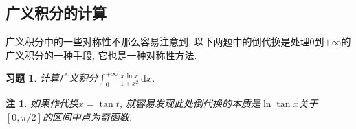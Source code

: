 \documentclass[11pt,a4paper]{ctexart}
\makeatletter
\theoremstyle{thmseries} %
\theoremstyle{exerseries}
\newtheorem{exer}{习题}[section]
\newtheorem*{rem}{注}
\renewenvironment{proof}[1][\proofname]{\par
  \pushQED{\qed}%
  \normalfont \topsep6\p@\@plus6\p@\relax
  \trivlist
  \item[\hskip\labelsep
        \itshape
    #1\@addpunct{}]\ignorespaces
}{%
  \popQED\endtrivlist\@endpefalse
}
\newenvironment{sol}{\begin{proof}[\bfseries\upshape 解\quad]}{\end{proof}}
\newcommand{\bra}[1]{\mathopen{}\left(#1\right)}
\newcommand{\sbra}[1]{\mathopen{}\left[#1\right]}
\newcommand{\R}{\mathbb{R}}
\renewcommand{\d}{\mathrm{d}}
\newcommand{\e}{\mathrm{e}}
\makeatother
\begin{document}





\subsection{广义积分的计算}
广义积分中的一些对称性不那么容易注意到. 以下两题中的倒代换是处理$0$到$+\infty$的广义积分的一种手段, 它也是一种对称性方法. 
\begin{exer}
	计算广义积分$\int_{0}^{+\infty}\frac{x\ln x}{1+x^2}\,\d x$. 
\end{exer}
\begin{rem}
	如果作代换$x=\tan t$, 就容易发现此处倒代换的本质是$\ln\tan x$关于$[0,\pi/2]$的区间中点为奇函数. 
\end{rem}
\end{document}
